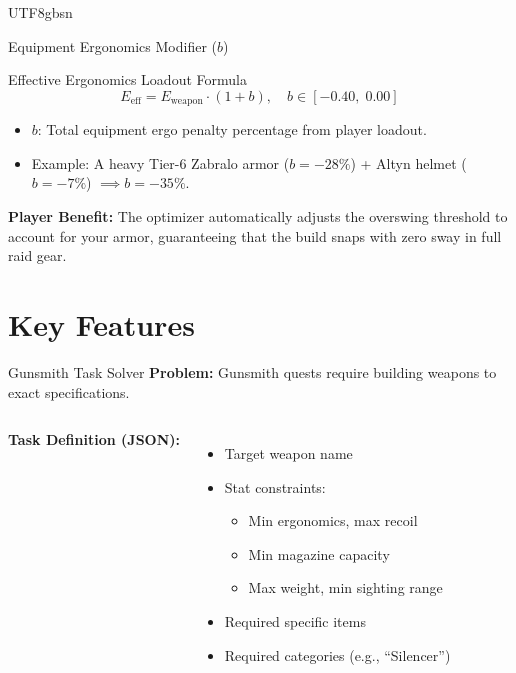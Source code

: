 \documentclass[aspectratio=169]{beamer}
\begin{document}
\begin{CJK*}{UTF8}{gbsn}
\begin{frame}{Equipment Ergonomics Modifier ($b$)}
    \vspace{0.3cm}
    \begin{block}{Effective Ergonomics Loadout Formula}
        \[
        E_{\text{eff}} = E_{\text{weapon}} \cdot (1 + b), \quad b \in [-0.40, \; 0.00]
        \]
        \begin{itemize}
            \item $b$: Total equipment ergo penalty percentage from player loadout.
            \item Example: A heavy Tier-6 Zabralo armor ($b = -28\%$) + Altyn helmet ($b = -7\%$) $\implies b = -35\%$.
        \end{itemize}
    \end{block}

    \vspace{0.3cm}
    \textbf{Player Benefit:} The optimizer automatically adjusts the overswing threshold to account for your armor, guaranteeing that the build snaps with zero sway in full raid gear.
\end{frame}

\section{Key Features}
\begin{frame}{Gunsmith Task Solver}
    \textbf{Problem:} Gunsmith quests require building weapons to exact specifications.

    \vspace{0.2cm}
    \begin{columns}
        \textbf{Task Definition (JSON):}
        \begin{itemize}
            \item Target weapon name
            \item Stat constraints:
            \begin{itemize}
                \item Min ergonomics, max recoil
                \item Min magazine capacity
                \item Max weight, min sighting range
            \end{itemize}
            \item Required specific items
            \item Required categories (e.g., ``Silencer'')
        \end{itemize}


\end{columns}
\end{frame}
\end{CJK*}
\end{document}

